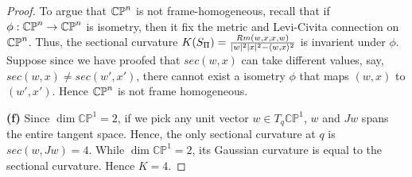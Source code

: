 \documentclass[11pt, a4paper]{article}
\theoremstyle{plain}
\theoremstyle{definition}
\theoremstyle{remark}
\begin{document}
{\begin{proof}
    To argue that $\mathbb{CP}^{n}$ is not frame-homogeneous, recall that if $\phi:\mathbb{CP}^{n} \to\mathbb{CP}^{n}$ is isometry, then it fix the metric and Levi-Civita connection
    on $\mathbb{CP}^{n}$. Thus, the sectional curvature $K(S_\Pi) = \frac{Rm(w,x,x,w)}{|w|^2|x|^2 - \langle w,x\rangle^2}$ is invarient under $\phi$. Suppose
    since we have proofed that $sec(w,x)$ can take different values, say, $sec(w,x)\ne sec(w',x')$, there cannot exist a isometry $\phi$
    that maps $(w,x)$ to $(w',x')$. Hence $\mathbb{CP}^{n}$ is not frame homogeneous.
    
    \textbf{(f)} Since $\dim \mathbb{CP}^1 = 2$, if we pick any unit vector $w\in T_q \mathbb{CP}^1$, $w$ and $Jw$ spans the entire tangent space.
    Hence, the only sectional curvature at $q$ is $sec(w,Jw) = 4$. While $\dim \mathbb{CP}^1 = 2$, its Gaussian curvature is equal to the sectional curvature.
    Hence $K = 4$.

\end{proof}
}
\end{document}
